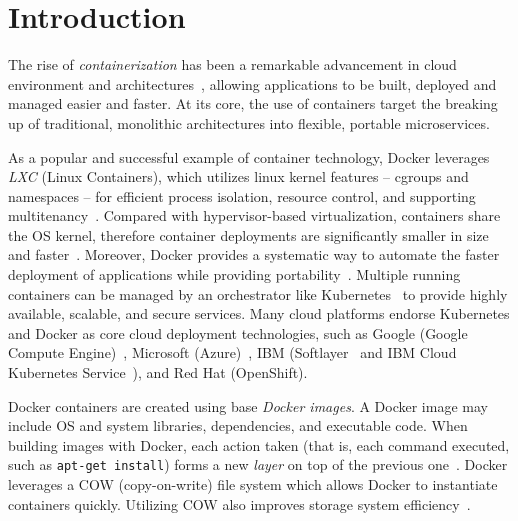 \section{Introduction}
 \label{sec:intro}

\vspace{-2pt}



The rise of \emph{containerization} has been a remarkable advancement in 
cloud environment and architectures~\cite{dockerbook},
allowing applications to be built, deployed and managed easier and faster.
At its core, the use of containers target the breaking up of traditional, monolithic architectures into flexible, portable microservices. 

As a popular and successful example of container technology,
Docker leverages \emph{LXC} (Linux Containers), which utilizes linux kernel features -- 
cgroups and namespaces -- for 
efficient process isolation, resource control, and supporting multitenancy~\cite{slacker, 7158965, cntr}.
Compared with hypervisor-based virtualization,
containers share the OS kernel,
therefore container deployments are significantly smaller in size and faster~\cite{7819678}.
Moreover, Docker provides a systematic way to automate the faster deployment of applications while providing portability~\cite{docker}. Multiple running containers can be managed by an orchestrator like Kubernetes~\cite{kubernetes} to provide highly available, scalable, and secure services.
Many cloud platforms endorse Kubernetes and Docker 
as core cloud deployment technologies,
such as Google (Google Compute Engine)~\cite{googlecengine},
Microsoft (Azure)~\cite{azurec},
IBM (Softlayer~\cite{softlayer} and IBM Cloud Kubernetes Service~\cite{ibmkube}),
 and
Red Hat (OpenShift).
 
Docker containers are created using base \emph{Docker images}. 
A Docker image may include OS and system libraries, dependencies, and executable code. 
When building images with Docker, 
each action taken (that is, each command executed, such as \texttt{apt-get install}) forms a new \emph{layer} on top of the previous one~\cite{docker}. 
Docker leverages a COW (copy-on-write) file system 
which allows Docker to instantiate containers quickly. 
Utilizing COW also improves storage system efficiency~\cite{docker, UnionFS}. 


